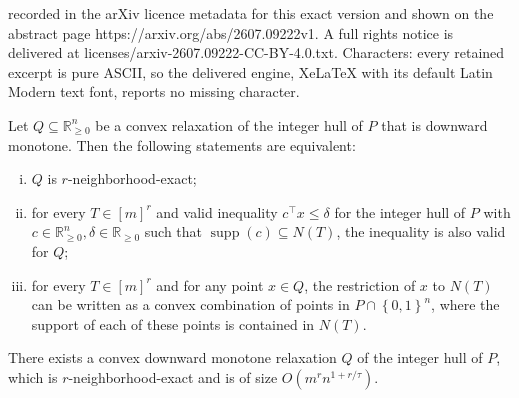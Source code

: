 \documentclass[10pt,a4paper]{amsart}
\DeclareMathOperator{\supp}{supp}
\newcommand{\R}{\mathbb{R}}
\newcommand{\numrows}{r}
\newcommand{\rhs}{\delta}
\newcommand{\set}[1]{\left\{#1\right\}}
\begin{document}
recorded in the arXiv licence metadata for this exact version and shown on the abstract page https://arxiv.org/abs/2607.09222v1. A full rights notice is delivered at licenses/arxiv-2607.09222-CC-BY-4.0.txt. Characters: every retained excerpt is pure ASCII, so the delivered engine, XeLaTeX with its default Latin Modern text font, reports no missing character.
\begin{lemma}\label{lem:r-nbh-exact-equivalence}
	Let $Q \subseteq \R^n_{\ge 0}$ be a convex relaxation of the integer hull of $P$ that is downward monotone. Then the following statements are equivalent:
\begin{enumerate}[(i)]
\item $Q$ is $\numrows$-neighborhood-exact;
\item for every $T \in [m]^\numrows$ and valid inequality $c^\intercal x \le \rhs$ for the integer hull of $P$ with $c \in \R^n_{\ge 0}, \rhs \in \R_{\ge 0}$ such that $\supp(c) \subseteq N(T)$, the inequality is also valid for $Q$;
\item for every $T \in [m]^\numrows$ and for any point $x \in Q$, the restriction of $x$ to $N(T)$ can be written as a convex combination of points in $P\cap \set{0,1}^n$, where the support of each of these points is contained in $N(T)$.
\end{enumerate}
\end{lemma}

\begin{lemma}\label{lem:construction-r-neighborhood-exact-relaxation}
    There exists a convex downward monotone relaxation $Q$ of the integer hull of $P$, which is $\numrows$-neighborhood-exact and is of size $O(m^rn^{1 + r/\tau})$.
\end{lemma}
\end{document}
